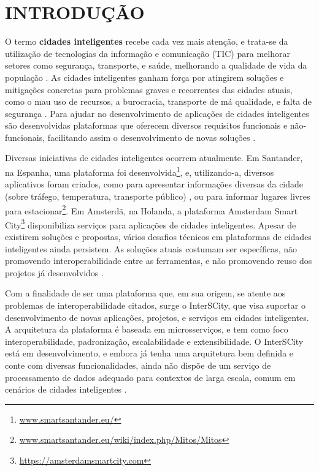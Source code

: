 \chapter[INTRODUÇÃO]{INTRODUÇÃO}
\label{chapter:intro}

O termo \textbf{cidades inteligentes} recebe cada vez mais atenção, e trata-se
da utilização de tecnologias da informação e comunicação (TIC) para melhorar
setores como segurança, transporte, e saúde, melhorando a qualidade de vida
da população \cite{batty2012smart}. As cidades inteligentes ganham força por
atingirem soluções e mitigações concretas para problemas graves e recorrentes
das cidades atuais, como o mau uso de recursos, a burocracia, transporte de má
qualidade, e falta de segurança \cite{batty2012smart}. Para ajudar no
desenvolvimento de aplicações de cidades inteligentes são desenvolvidas
plataformas que oferecem diversos requisitos funcionais e não-funcionais,
facilitando assim o desenvolvimento de novas soluções \cite{kon2016}.

Diversas iniciativas de cidades inteligentes ocorrem atualmente. Em Santander,
na Espanha, uma plataforma foi
desenvolvida\footnote{\url{www.smartsantander.eu/}}, e, utilizando-a,
diversos aplicativos foram criados, como para apresentar informações diversas
da cidade (sobre tráfego, temperatura, transporte público)
\cite{gutierrez2013}, ou para informar lugares livres para
estacionar\footnote{\url{www.smartsantander.eu/wiki/index.php/Mitos/Mitos}}.
Em Amsterdã, na Holanda, a plataforma Amsterdam Smart
City\footnote{\url{https://amsterdamsmartcity.com}} disponibiliza serviços para
aplicações de cidades inteligentes. Apesar de existirem soluções
e propostas, vários desafios técnicos em plataformas de cidades inteligentes
ainda persistem. As soluções atuais costumam ser específicas, não promovendo
interoperabilidade entre as ferramentas, e não promovendo reuso dos projetos já
desenvolvidos \cite{delesposte2017}.

Com a finalidade de ser uma plataforma que, em sua origem, se atente aos
problemas de interoperabilidade citados, surge o InterSCity, que visa
suportar o desenvolvimento de novas aplicações, projetos, e serviços em cidades
inteligentes. A arquitetura da plataforma é baseada em microsserviços, e
tem como foco interoperabilidade, padronização, escalabilidade e
extensibilidade. O InterSCity está em desenvolvimento, e embora já tenha uma
arquitetura bem definida e conte com diversas funcionalidades, ainda não dispõe
de um serviço de processamento de dados adequado para contextos de larga
escala, comum em cenários de cidades inteligentes \cite{alnuaimi2015}.

